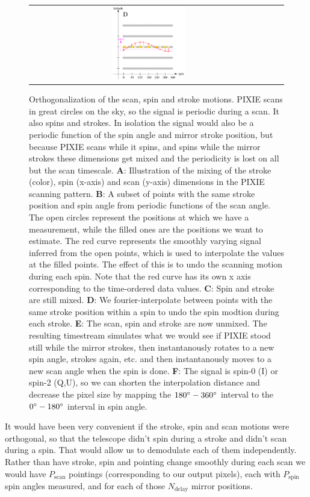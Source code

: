 \documentclass{article}
\begin{document}
\begin{figure}
\begin{tabular}{ccc}
		\includegraphics[width=0.32\textwidth]{plots/shift4.pdf}
	\end{tabular}
	\caption{Orthogonalization of the scan, spin and stroke
	motions. PIXIE scans in great circles on the sky, so the
	signal is periodic during a scan. It also spins and strokes.
	In isolation the signal would also be a periodic function
	of the spin angle and mirror stroke position, but because
	PIXIE scans while it spins, and spins
	while the mirror strokes these dimensions get mixed and the
	periodicity is lost on all but the scan timescale.
	\textbf{A}: Illustration of the mixing of the stroke (color),
	spin (x-axis) and scan (y-axis) dimensions in the PIXIE scanning
	pattern. \textbf{B}: A subset of points with the same stroke
	position and spin angle from periodic functions of the scan
	angle. The open circles represent the positions at which
	we have a measurement, while the filled ones are the positions
	we want to estimate. The red curve represents the smoothly
	varying signal inferred from the open points, which is used to
	interpolate the values at the filled points. The effect of
	this is to undo the scanning motion during each spin.
	Note that the red curve has its own x axis corresponding
	to the time-ordered data values.
	\textbf{C}: Spin and stroke are still
	mixed. \textbf{D}: We fourier-interpolate between points with
	the same stroke position within a spin to undo the spin
	modtion during each stroke. \textbf{E}: The scan, spin and stroke
	are now unmixed. The resulting timestream simulates what we would
	see if PIXIE stood still while the mirror strokes, then
	instantanously rotates to a new spin angle, strokes again, etc.
	and then instantanously moves to a new scan angle when the spin is done.
	\textbf{F}: The signal is spin-0 (I) or spin-2 (Q,U), so we can
	shorten the interpolation distance and decrease the pixel size
	by mapping the $180\degree-360\degree$ interval to the $0\degree-
	180\degree$ interval in spin angle.}
	\label{fig:ortho}
\end{figure}
It would have been very convenient if the stroke, spin and scan motions were
orthogonal, so that the telescope didn't spin during a stroke and didn't scan
during a spin. That would allow us to demodulate each of them independently.
Rather than have stroke, spin and pointing change smoothly during each scan
we would have $P_\textrm{scan}$ pointings (corresponding
to our output pixels), each with
$P_\textrm{spin}$ spin angles measured, and for each
of those $N_\textrm{delay}$ mirror positions.
\end{document}
